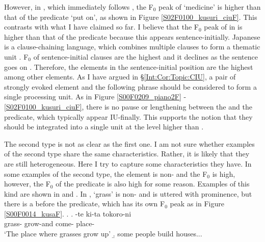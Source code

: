 However, in \Last[b], which immediately follows \Last[a],
the F$_{0}$ peak of  `medicine' is higher than that of the predicate  `put on',
as shown in Figure \ref{S02F0100_kusuri_ciuF}.
This contrasts with what I have claimed so far.
I believe that the F$_{0}$ peak of  in \Last[b] is higher than that of the predicate because this appears sentence-initially.
Japanese is a clause-chaining language,
which combines multiple clauses to form a thematic unit \cite{longacre85,martin92,givon01}.
F$_{0}$ of sentence-initial clauses are the highest and it declines as the sentence goes on \cite{koisoishimoto12,ishimotokoiso12,ishimotokoiso13}.
Therefore,
the elements in the sentence-initial position are the highest among other elements.
As I have argued in \S \ref{Int:Cor:Topic:CIU},
a pair of strongly evoked element and the following phrase should be considered to form a single processing unit.
As in Figure \ref{S00F0209_piano2F} - \ref{S02F0100_kusuri_ciuF},
there is no pause or  lengthening between the  and the predicate,
which typically appear IU-finally.
This supports the notion that they should be integrated into a single unit at the level higher than .


The second type is not as clear as the first one.
I am not sure whether examples of the second type share the same characteristics.
Rather, it is likely that they are still heterogeneous.
Here I try to capture some characteristics they have.
In some examples of the second type,
the element is non- and the F$_{0}$ is high,
however, the F$_{0}$ of the predicate is also high for some reason.
Examples of this kind are shown in \Next and \NNext.
In \Next,  `grass' is non- and is uttered with prominence,
but there is a  before the predicate, which has its own F$_{0}$ peak as in Figure \ref{S00F0014_kusaF}.
%
\ex.\label{S00F0014_kusa}
 \ag.  \tp{\dvline} -te ki-ta \tp{\dvline} tokoro-ni \tp{\dvline} \\
 		grass- {} grow-and come- {} place- {} \\
		`The place where grasses grow up'
 \b. some people build houses...

